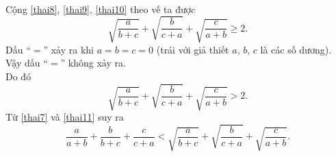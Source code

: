 \begin{ex}
{\begin{itemize}
\begin{align}
   \end{align}
   Cộng \eqref{thai8}, \eqref{thai9}, \eqref{thai10} theo vế ta được
   \begin{equation*}
    \sqrt{\dfrac{a}{b+c}} + \sqrt{\dfrac{b}{c+a}} + \sqrt{\dfrac{c}{a+b}} \geq 2.
   \end{equation*}
   Dấu ``$=$'' xảy ra khi $a=b=c=0$ (trái với giả thiết $a$, $b$, $c$ là các số dương). Vậy dấu ``$=$'' không xảy ra.\\
   Do đó
   \begin{equation}
    \sqrt{\dfrac{a}{b+c}} + \sqrt{\dfrac{b}{c+a}} + \sqrt{\dfrac{c}{a+b}} > 2. \label{thai11}
   \end{equation}
   Từ \eqref{thai7} và \eqref{thai11} suy ra
   $$\dfrac{a}{a+b} + \dfrac{b}{b+c} + \dfrac{c}{c+a} < \sqrt{\dfrac{a}{b+c}} + \sqrt{\dfrac{b}{c+a}} + \sqrt{\dfrac{c}{a+b}}.$$
  \end{itemize}
  }
\end{ex}


